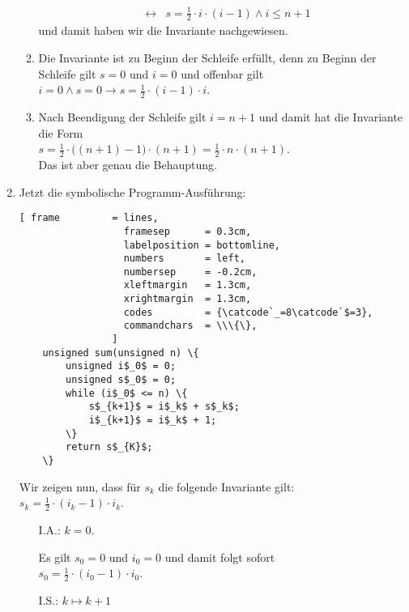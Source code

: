 \documentclass{article}
\renewcommand{\labelenumii}{\arabic{enumii}.}
\begin{document}
\begin{enumerate}
\begin{enumerate}
\begin{eqnarray*}
      & \leftrightarrow & s = \frac{1}{2} \cdot i \cdot (i-1) \wedge i \leq n + 1                         
      \end{eqnarray*}
      und damit haben wir die Invariante nachgewiesen.
\item Die Invariante ist zu Beginn der Schleife erf\"ullt, denn zu Beginn der
      Schleife gilt $s = 0$ und $i = 0$ und offenbar gilt
      \\[0.2cm]
      \hspace*{1.3cm}
      $i = 0 \wedge s = 0 \rightarrow s = \frac{1}{2} \cdot (i-1) \cdot i$.
\item Nach Beendigung der Schleife gilt $i = n + 1$ und damit hat die Invariante die Form
      \\[0.2cm]
      \hspace*{1.3cm}
      $s = \frac{1}{2} \cdot \bigl((n+1)-1\bigl) \cdot (n+1) = \frac{1}{2} \cdot n \cdot (n+1)$.
      \\[0.2cm]
      Das ist aber genau die Behauptung.
\end{enumerate}
\item Jetzt die symbolische Programm-Ausf\"uhrung:
      \begin{Verbatim}[ frame         = lines, 
                  framesep      = 0.3cm, 
                  labelposition = bottomline,
                  numbers       = left,
                  numbersep     = -0.2cm,
                  xleftmargin   = 1.3cm,
                  xrightmargin  = 1.3cm,
                  codes         = {\catcode`_=8\catcode`$=3},
                  commandchars  = \\\{\},
                ]
    unsigned sum(unsigned n) \{
        unsigned i$_0$ = 0;
        unsigned s$_0$ = 0;
        while (i$_0$ <= n) \{
            s$_{k+1}$ = i$_k$ + s$_k$;
            i$_{k+1}$ = i$_k$ + 1;
        \}
        return s$_{K}$;
    \}
    \end{Verbatim} 
      Wir zeigen nun, dass f\"ur $s_k$ die folgende Invariante gilt: 
      \\[0.2cm]
      \hspace*{1.3cm}
      $s_k = \frac{1}{2} \cdot (i_{k}-1) \cdot i_k$.
      \renewcommand{\labelenumii}{\arabic{enumii}.}
      \begin{enumerate}
      \item[I.A.:] $k=0$.

            Es gilt $s_0 = 0$ und $i_0 = 0$ und damit folgt sofort
            \\[0.2cm]
            \hspace*{1.3cm} $s_0 = \frac{1}{2} \cdot (i_{0}-1) \cdot i_0$.
      \item[I.S.:] $k \mapsto k+1$ 


\end{enumerate}
\end{enumerate}
\end{document}
